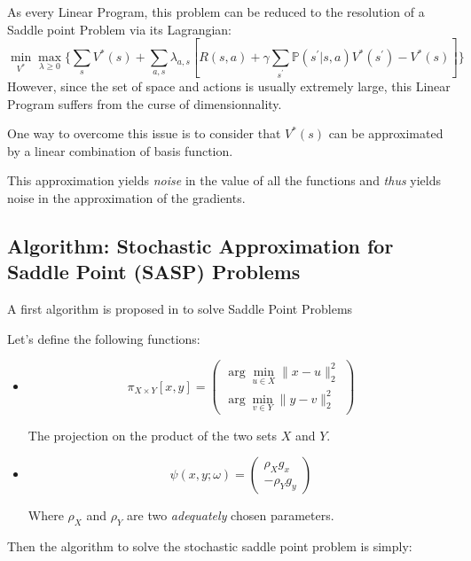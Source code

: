 \documentclass[12pt,reqno]{amsart}
\numberwithin{equation}{section}
\begin{document}
As every Linear Program, this problem can be reduced to the resolution of a Saddle point Problem via its Lagrangian:
$$
\min_{V^{*}}\max_{\lambda \geq 0}\{ \sum_{s} V^{*}(s) + \sum_{a,s}\lambda_{a,s}[R(s,a) + \gamma \sum_{s^{'}}\mathbb{P}(s^{'}| s,a )V^{*}(s^{'}) - V^{*}(s)] \}
$$
However, since the set of space and actions is usually extremely large, this Linear Program suffers from the curse of dimensionnality.

One way to overcome this issue is to consider that $V^{*}(s)$ can be approximated by a linear combination of basis function.

This approximation yields \emph{noise} in the value of all the functions and \emph{thus} yields noise in the approximation of the gradients.



\subsection{Algorithm: Stochastic Approximation for Saddle Point (SASP) Problems}

A first algorithm is proposed in \cite{NemirovskiRubinstein} to solve Saddle Point Problems


Let's define the following functions:
\begin{itemize}
\item $$\pi_{X \times Y}[x,y] = \begin{pmatrix} \arg\min_{u \in X}\lVert x - u \rVert_{2}^{2} \\ \arg\min_{v \in Y}\lVert y - v \rVert_{2}^{2} \end{pmatrix}$$

The projection on the product of the two sets $X$ and $Y$.

\item $$\psi(x,y;\omega) = \begin{pmatrix} \rho_{X} g_{x} \\ -\rho_{Y} g_{y}  \end{pmatrix}$$

Where $\rho_{X}$ and $\rho_{Y}$ are two \emph{adequately} chosen parameters.

\end{itemize}


\vspace{0.5cm}

Then the algorithm to solve the stochastic saddle point problem is simply:

\vspace{0.5cm}
\end{document}
